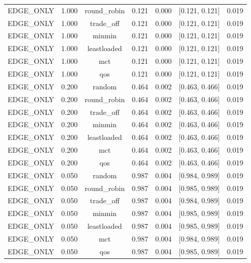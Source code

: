 \begin{table}
\begin{tabular}{lcccccc}
EDGE\_ONLY & 1.000 & round\_robin & 0.121 & 0.000 & [0.121, 0.121] & 0.019 \\
EDGE\_ONLY & 1.000 & trade\_off & 0.121 & 0.000 & [0.121, 0.121] & 0.019 \\
EDGE\_ONLY & 1.000 & minmin & 0.121 & 0.000 & [0.121, 0.121] & 0.019 \\
EDGE\_ONLY & 1.000 & leastloaded & 0.121 & 0.000 & [0.121, 0.121] & 0.019 \\
EDGE\_ONLY & 1.000 & mct & 0.121 & 0.000 & [0.121, 0.121] & 0.019 \\
EDGE\_ONLY & 1.000 & qos & 0.121 & 0.000 & [0.121, 0.121] & 0.019 \\
EDGE\_ONLY & 0.200 & random & 0.464 & 0.002 & [0.463, 0.466] & 0.019 \\
EDGE\_ONLY & 0.200 & round\_robin & 0.464 & 0.002 & [0.463, 0.466] & 0.019 \\
EDGE\_ONLY & 0.200 & trade\_off & 0.464 & 0.002 & [0.463, 0.466] & 0.019 \\
EDGE\_ONLY & 0.200 & minmin & 0.464 & 0.002 & [0.463, 0.466] & 0.019 \\
EDGE\_ONLY & 0.200 & leastloaded & 0.464 & 0.002 & [0.463, 0.466] & 0.019 \\
EDGE\_ONLY & 0.200 & mct & 0.464 & 0.002 & [0.463, 0.466] & 0.019 \\
EDGE\_ONLY & 0.200 & qos & 0.464 & 0.002 & [0.463, 0.466] & 0.019 \\
EDGE\_ONLY & 0.050 & random & 0.987 & 0.004 & [0.984, 0.989] & 0.019 \\
EDGE\_ONLY & 0.050 & round\_robin & 0.987 & 0.004 & [0.985, 0.989] & 0.019 \\
EDGE\_ONLY & 0.050 & trade\_off & 0.987 & 0.004 & [0.984, 0.989] & 0.019 \\
EDGE\_ONLY & 0.050 & minmin & 0.987 & 0.004 & [0.985, 0.989] & 0.019 \\
EDGE\_ONLY & 0.050 & leastloaded & 0.987 & 0.004 & [0.985, 0.989] & 0.019 \\
EDGE\_ONLY & 0.050 & mct & 0.987 & 0.004 & [0.984, 0.989] & 0.019 \\
EDGE\_ONLY & 0.050 & qos & 0.987 & 0.004 & [0.985, 0.989] & 0.019 \\
\bottomrule
\end{tabular}
\par\vspace{2pt}{\footnotesize\raggedright Detectable difference is 2.8 times the pooled between-seed standard deviation divided by the square root of the seed count; differences smaller than this are not resolvable with ten seeds and are not interpreted.\par}
\end{table}
